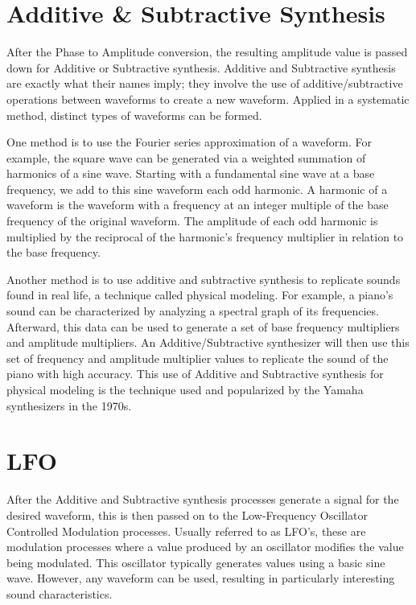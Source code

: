 \documentclass[a4paper,12pt]{report}
\begin{document}
\section{Additive \& Subtractive Synthesis}
\label{sec:addsubsynthesis}
After the Phase to Amplitude conversion, the resulting amplitude value is passed down for Additive or Subtractive synthesis. Additive and Subtractive synthesis are exactly what their names imply; they involve the use of additive/subtractive operations between waveforms to create a new waveform. Applied in a systematic method, distinct types of waveforms can be formed.

One method is to use the Fourier series approximation of a waveform. For example, the square wave can be generated via a weighted summation of harmonics of a sine wave. Starting with a fundamental sine wave at a base frequency, we add to this sine waveform each odd harmonic. A harmonic of a waveform is the waveform with a frequency at an integer multiple of the base frequency of the original waveform. The amplitude of each odd harmonic is multiplied by the reciprocal of the harmonic's frequency multiplier in relation to the base frequency.

Another method is to use additive and subtractive synthesis to replicate sounds found in real life, a technique called physical modeling. For example, a piano's sound can be characterized by analyzing a spectral graph of its frequencies. Afterward, this data can be used to generate a set of base frequency multipliers and amplitude multipliers. An Additive/Subtractive synthesizer will then use this set of frequency and amplitude multiplier values to replicate the sound of the piano with high accuracy. This use of Additive and Subtractive synthesis for physical modeling is the technique used and popularized by the Yamaha synthesizers in the 1970s.

\section{LFO}
\label{sec:lfo}
After the Additive and Subtractive synthesis processes generate a signal for the desired waveform, this is then passed on to the Low-Frequency Oscillator Controlled Modulation processes. Usually referred to as LFO's, these are modulation processes where a value produced by an oscillator modifies the value being modulated. This oscillator typically generates values using a basic sine wave. However, any waveform can be used, resulting in particularly interesting sound characteristics.
\end{document}
